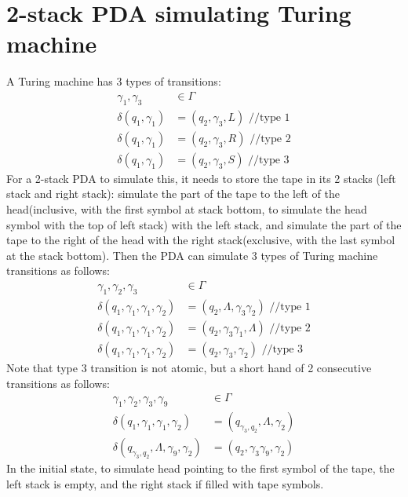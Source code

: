 \documentclass{article}
\begin{document}
\section{2-stack PDA simulating Turing machine}
 A Turing machine has 3 types of transitions:
\begin{align*}
\gamma_1, \gamma_3 &\in \Gamma\\
\delta(q_1, \gamma_1) &= (q_2, \gamma_3, L) \text{ //type 1}\\
\delta(q_1, \gamma_1) &= (q_2, \gamma_3, R) \text{ //type 2}\\
\delta(q_1, \gamma_1) &= (q_2, \gamma_3, S) \text{ //type 3}
\end{align*}
For a 2-stack PDA to simulate this, it needs to store the tape in its
2 stacks (left stack and right stack): simulate the part of the tape to the left
of the head(inclusive, with the first symbol at stack bottom, to simulate the
head symbol with the top of left stack) with the left stack, and simulate the
part of the tape to the right of the head with the right stack(exclusive, with
the last symbol at the stack bottom). Then the PDA can simulate 3 types of
Turing machine transitions as follows:
\begin{align*}
\gamma_1, \gamma_2, \gamma_3 &\in \Gamma\\
\delta(q_1, \gamma_1, \gamma_1, \gamma_2) &= (q_2, \Lambda, \gamma_3 \gamma_2) \text{ //type 1}\\
\delta(q_1, \gamma_1, \gamma_1, \gamma_2) &= (q_2, \gamma_3 \gamma_1, \Lambda) \text{ //type 2}\\
\delta(q_1, \gamma_1, \gamma_1, \gamma_2) &= (q_2, \gamma_3, \gamma_2) \text{ //type 3}
\end{align*}
Note that type 3 transition is not atomic, but a short hand of 2 consecutive
transitions as follows:
\begin{align*}
\gamma_1, \gamma_2, \gamma_3, \gamma_9 &\in \Gamma\\
\delta(q_1, \gamma_1, \gamma_1, \gamma_2) &= (q_{\gamma_3, q_2}, \Lambda, \gamma_2)\\
\delta(q_{\gamma_3, q_2}, \Lambda, \gamma_9, \gamma_2) &= (q_2, \gamma_3\gamma_9, \gamma_2)
\end{align*}
In the initial state, to simulate head pointing to the first symbol of the tape,
the left stack is empty, and the right stack if filled with tape symbols.
\end{document}
